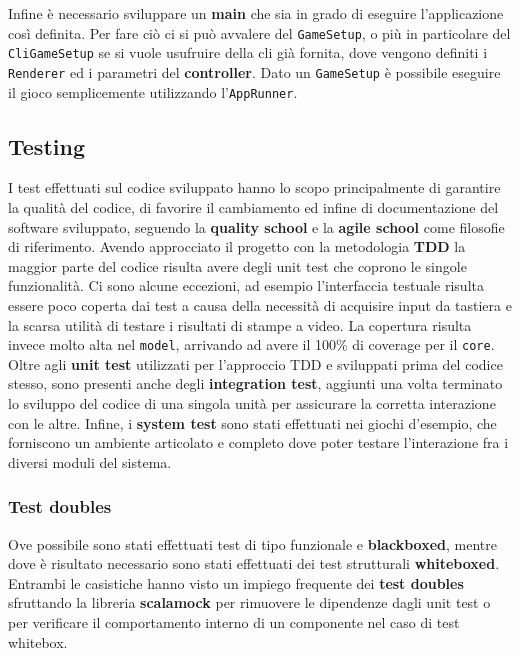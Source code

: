 Infine è necessario sviluppare un \textbf{main} che sia in grado di eseguire l'applicazione così definita.
%
Per fare ciò ci si può avvalere del \texttt{GameSetup}, o più in particolare del \texttt{CliGameSetup} se si vuole usufruire della cli già fornita, dove vengono definiti i \texttt{Renderer} ed i parametri del \textbf{controller}.
%
Dato un \texttt{GameSetup} è possibile eseguire il gioco semplicemente utilizzando l'\texttt{AppRunner}.


\subsection{Testing}
I test effettuati sul codice sviluppato hanno lo scopo principalmente di garantire la qualità del codice, di favorire il cambiamento ed infine di documentazione del software sviluppato, seguendo la \textbf{quality school} e la \textbf{agile school} come filosofie di riferimento.
%
Avendo approcciato il progetto con la metodologia \textbf{TDD} la maggior parte del codice risulta avere degli unit test che coprono le singole funzionalità.
%
Ci sono alcune eccezioni, ad esempio l'interfaccia testuale risulta essere poco coperta dai test a causa della necessità di acquisire input da tastiera e la scarsa utilità di testare i risultati di stampe a video.
%
La copertura risulta invece molto alta nel \texttt{model}, arrivando ad avere il 100\% di coverage per il \texttt{core}.
%
Oltre agli \textbf{unit test} utilizzati per l'approccio TDD e sviluppati prima del codice stesso, sono presenti anche degli \textbf{integration test}, aggiunti una volta terminato lo sviluppo del codice di una singola unità per assicurare la corretta interazione con le altre.
%
Infine, i \textbf{system test} sono stati effettuati nei giochi d'esempio, che forniscono un ambiente articolato e completo dove poter testare l'interazione fra i diversi moduli del sistema.

\subsubsection{Test doubles}
Ove possibile sono stati effettuati test di tipo funzionale e \textbf{blackboxed}, mentre dove è risultato necessario sono stati effettuati dei test strutturali \textbf{whiteboxed}.
%
Entrambi le casistiche hanno visto un impiego frequente dei \textbf{test doubles} sfruttando la libreria \textbf{scalamock} per rimuovere le dipendenze dagli unit test o per verificare il comportamento interno di un componente nel caso di test whitebox.

